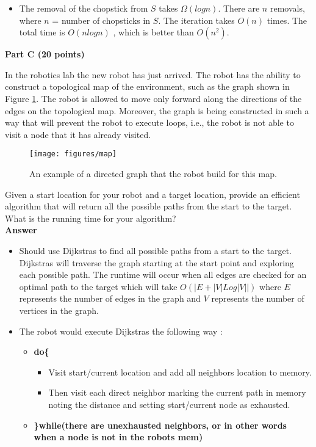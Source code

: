 \documentclass{article}
\begin{document}
\begin{itemize}
\item The removal of the chopstick from $S$ takes $\Omega(log n)$. There are $n$ removals, where $n$ = number of chopsticks in $S$. The iteration takes $O(n)$ times. The total time is {\bf $O(n log n)$ }, which is better than $O(n^2)$.
\end{itemize}

\begin{center}
{\bf Part C (20 points)}
\end{center}


 In the robotics lab the new robot has just
arrived. The robot has the ability to construct a topological map of
the environment, such as the graph shown in Figure
\ref{fig:problem3}. The robot is allowed to move only forward along
the directions of the edges on the topological map. Moreover, the
graph is being constructed in such a way that will prevent the robot
to execute loops, i.e., the robot is not able to visit a node that it
has already visited.\\

\begin{figure}[h]
\centering
\texttt{[image: figures/map]}
\caption{An example of a directed graph that the robot build for this map.}
\label{fig:problem3}
\end{figure}

 Given a start location for your robot and a target
location, provide an efficient algorithm that will return all the
possible paths from the start to the target.  What is the running time
for your algorithm?\\

\textbf{ Answer }
\begin{itemize}
\item Should use Dijkstras to find all possible paths from a start to the target. Dijkstras will traverse the graph starting at the start point and exploring each possible path. The  runtime will occur when all edges are checked for an optimal path to the target which will take $O(|E+|V|Log|V||)$ where $E$ represents the number of edges in the graph and $V$ represents the number of vertices in the graph.

\item The robot would execute Dijkstras the following way :
\begin{itemize}
\item {\bf do\{ }
\begin{itemize}
\item Visit start/current location and add all neighbors location to memory.
\item Then visit each direct neighbor marking the current path in memory noting the distance and setting start/current node as exhausted.
\end{itemize}
\item {\bf \}while(there are unexhausted neighbors, or in other words when a node is not in the robots mem) }
\end{itemize}
\end{itemize}
\end{document}
